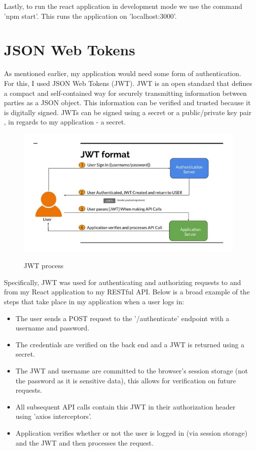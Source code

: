 Lastly, to run the react application in development mode we use the command 'npm start'. This runs the application on 'localhost:3000'.

\section{JSON Web Tokens}
As mentioned earlier, my application would need some form of authentication. For this, I used JSON Web Tokens (JWT). JWT is an open standard that defines a compact and self-contained way for securely transmitting information between parties as a JSON object. This information can be verified and trusted because it is digitally signed. JWTs can be signed using a secret or a public/private key pair \cite{JWT}, in regards to my application - a secret.

\begin{figure}[ht]
    \centering
    \includegraphics[scale=0.4]{Images/jwt1.jpeg} 
    \label{jwt1_label}
    \caption{JWT process}
\end{figure}

Specifically, JWT was used for authenticating and authorizing requests to and from my React application to my RESTful API. Below is a broad example of the steps that take place in my application when a user logs in:
\begin{itemize}
    \item The user sends a POST request to the '/authenticate' endpoint with a username and password. 
    \item The credentials are verified on the back end and a JWT is returned using a secret.
    \item The JWT and username are committed to the browser's session storage (not the password as it is sensitive data), this allows for verification on future requests.
    \item All subsequent API calls contain this JWT in their  authorization header using 'axios interceptors'.
    \item Application verifies whether or not the user is logged in (via session storage) and the JWT and then processes the request.
\end{itemize}


